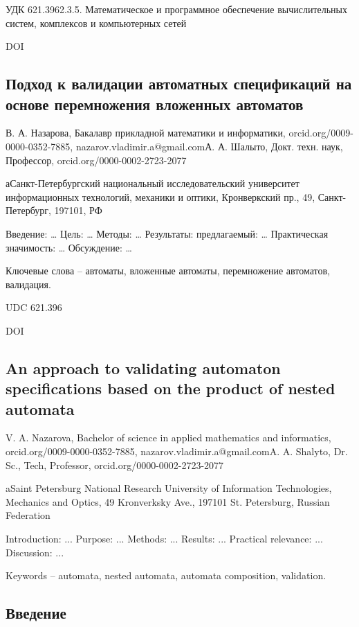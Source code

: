 \documentclass[12pt]{article}
\begin{document}
УДК 621.3962.3.5. Математическое и программное обеспечение вычислительных систем, комплексов и компьютерных сетей

DOI

\subsection*{Подход к валидации автоматных спецификаций на основе перемножения вложенных автоматов}

В. А. Назарова, Бакалавр прикладной математики и информатики, orcid.org/0009-0000-0352-7885, nazarov.vladimir.a@gmail.comА. А. Шалыто, Докт. техн. наук, Профессор, orcid.org/0000-0002-2723-2077

аСанкт-Петербургский национальный исследовательский университет информационных технологий, механики и оптики, Кронверкский пр., 49, Санкт-Петербург, 197101, РФ

Введение: … Цель: … Методы: … Результаты: предлагаемый: … Практическая значимость: … Обсуждение: …

Ключевые слова – автоматы, вложенные автоматы, перемножение автоматов, валидация.

UDC 621.396

DOI

\subsection*{An approach to validating automaton specifications based on the product of nested automata}

V. A. Nazarova, Bachelor of science in applied mathematics and informatics, orcid.org/0009-0000-0352-7885, nazarov.vladimir.a@gmail.comA. A. Shalyto, Dr. Sc., Tech, Professor, orcid.org/0000-0002-2723-2077

aSaint Petersburg National Research University of Information Technologies, Mechanics and Optics, 49 Kronverksky Ave., 197101 St. Petersburg, Russian Federation

Introduction: ... Purpose: ... Methods: ... Results: ... Practical relevance: ... Discussion: ...

Keywords – automata, nested automata, automata composition, validation.

\subsection*{Введение}
\end{document}
